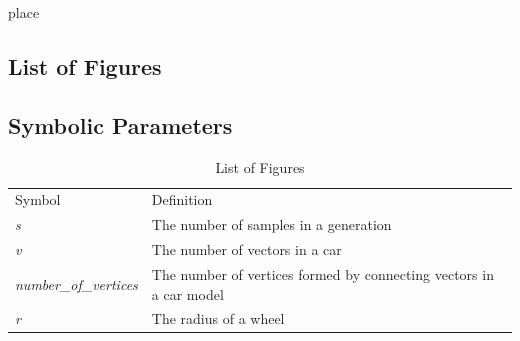 \documentclass[12pt, titlepage]{article}
\begin{document}
place

\subsection{List of Figures}

\subsection{Symbolic Parameters}

\begin{table}[h!]
\centering
\label{LOF}
\begin{tabular}{ll}
Symbol & Definition \\
\textit{s} & The number of samples in a generation  \\
\textit{v} & The number of vectors in a car  \\
\textit{number\_of\_vertices} & The number of vertices formed by connecting 
vectors in a car model \\
\textit{r} & The radius of a wheel
\end{tabular}
\caption{List of Figures}
\end{table}
\end{document}
